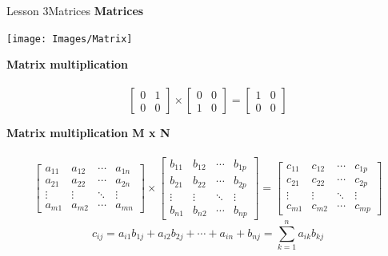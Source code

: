 \documentclass[aspectratio=1610]{beamer}
\begin{document}
\begin{frame}{Lesson 3}{Matrices}
\LARGE
\textbf{Matrices}
\begin{center}
\texttt{[image: Images/Matrix]}
\end{center}
\end{frame}


\begin{frame}[fragile]
\LARGE
\textbf{Matrix multiplication}\\~\\
   \[  \begin{bmatrix}
         0 & 1\\ 
         0 & 0 
     \end{bmatrix}
     \times
     \begin{bmatrix}
         0 & 0\\ 
         1 & 0  
     \end{bmatrix}
      =
     \begin{bmatrix}
         1 & 0\\ 
         0 & 0   
     \end{bmatrix} \] 
\end{frame}


\begin{frame}[fragile]
\LARGE
\textbf{Matrix multiplication M x N}\\~\\
\Large
    \[ \begin{bmatrix}
         a_{11} & a_{12} & \cdots & a_{1n}\\
         a_{21} & a_{22} & \cdots & a_{2n}\\ 
         \vdots & \vdots & \ddots & \vdots\\ 
         a_{m1} & a_{m2} & \cdots & a_{mn} 
     \end{bmatrix}
     \times
     \begin{bmatrix}
         b_{11} & b_{12} & \cdots & b_{1p}\\
         b_{21} & b_{22} & \cdots & b_{2p}\\ 
         \vdots & \vdots & \ddots & \vdots\\ 
         b_{n1} & b_{n2} & \cdots & b_{np} 
     \end{bmatrix}
      =
     \begin{bmatrix}
         c_{11} & c_{12} & \cdots & c_{1p}\\
         c_{21} & c_{22} & \cdots & c_{2p}\\ 
         \vdots & \vdots & \ddots & \vdots\\ 
         c_{m1} & c_{m2} & \cdots & c_{mp} 
     \end{bmatrix} \]
  \[ c_{ij}= a_{i1} b_{1j} + a_{i2} b_{2j} +\cdots+ a_{in} + b_{nj} = \sum_{k=1}^n a_{ik}b_{kj} \]
\end{frame}
\end{document}
